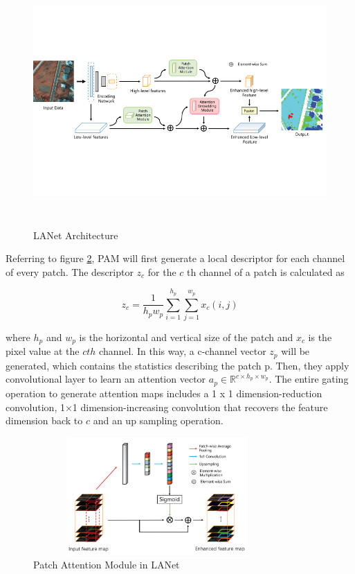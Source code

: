 \FloatBarrier
\begin{figure}[ht]
\includegraphics[width=12.5cm, height=9.5cm]{images/lanet.png}
\centering
\caption{LANet Architecture \protect\cite{lanet}}
\label{fig:lanet}
\end{figure}

\FloatBarrier

Referring to figure \ref{fig:pam}, PAM will first generate a local descriptor for each channel of every patch. The descriptor $z_c$ for the $c$ th channel of a patch is calculated as

\begin{equation}
    z_c = \frac{1}{h_p w_p} \sum_{i=1}^{h_p} \sum_{j=1}^{w_p} x_c(i,j)
\end{equation}

where $h_p$ and $w_p$ is the horizontal and vertical size of the patch and $x_c$ is the pixel value at the $cth$ channel. In this way, a c-channel vector $z_p$ will be generated, which contains the statistics describing the patch p. Then, they apply convolutional layer to learn an attention vector $a_p \in \mathbb{R}^{c \times h_p \times w_p}$. The entire gating operation to generate attention maps includes a 1 x 1 dimension-reduction convolution, 1×1 dimension-increasing convolution that recovers the feature dimension back to $c$ and an up sampling operation.
\begin{figure}[ht]
\includegraphics[width=9.5cm, height=4.5cm]{images/pam.png}
\centering
\caption{Patch Attention Module in LANet \protect\cite{lanet}}
\label{fig:pam}
\end{figure}
\FloatBarrier

